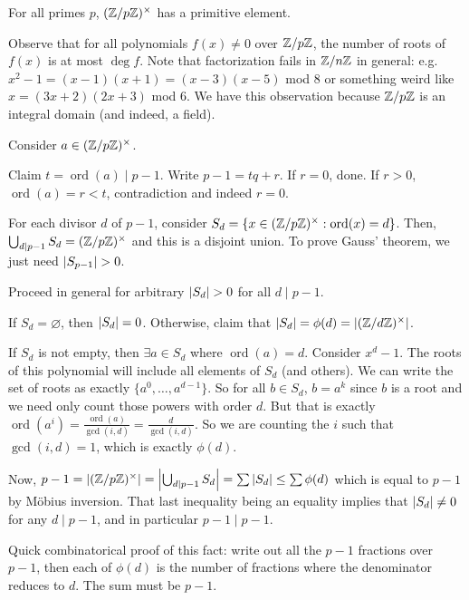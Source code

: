 \documentclass[notes]{agony}
\newcommand{\ord}{\operatorname{ord}}
\begin{document}
\begin{theorem}
  For all primes $p$, $(\mathbb{Z}/p\mathbb{Z})^\times$ has a primitive element.
\end{theorem}
\begin{prf}
  Observe that for all polynomials $f(x) \neq 0$ over $\mathbb{Z}/p\mathbb{Z}$,
  the number of roots of $f(x)$ is at most $\deg f$.
  Note that factorization fails in $\mathbb{Z}/n\mathbb{Z}$ in general:
  e.g. $x^2 - 1 = (x-1)(x+1) = (x-3)(x-5)$ mod 8
  or something weird like $x = (3x+2)(2x+3)$ mod 6.
  We have this observation because $\mathbb{Z}/p\mathbb{Z}$ is an integral domain (and indeed, a field).

  Consider $a \in (\mathbb{Z}/p\mathbb{Z})^\times$.

  Claim $t=\ord(a) \mid p-1$.
  Write $p-1=tq+r$. If $r=0$, done.
  If $r > 0$, $\ord(a) = r < t$, contradiction and indeed $r=0$.

  For each divisor $d$ of $p-1$, consider
  $S_d = \{x \in (\Z/p\Z)^\times : \ord(x) = d\}$.
  Then, $\bigcup_{d \mid p-1}S_d = (\mathbb{Z}/p\mathbb{Z})^\times$
  and this is a disjoint union.
  To prove Gauss' theorem, we just need $\abs{S_{p-1}} > 0$.

  Proceed in general for arbitrary $\abs{S_d} > 0$ for all $d \mid p-1$.

  If $S_d = \varnothing$, then $\abs{S_d} = 0$.
  Otherwise, claim that $\abs{S_d} = \phi(d) = \abs{(\mathbb{Z}/d\mathbb{Z})^\times}$.

  If $S_d$ is not empty, then $\exists a \in S_d$ where $\ord(a) = d$.
  Consider $x^d - 1$.
  The roots of this polynomial will include all elements of $S_d$ (and others).
  We can write the set of roots as exactly $\{a^0,\dotsc,a^{d-1}\}$.
  So for all $b \in S_d$, $b = a^k$ since $b$ is a root
  and we need only count those powers with order $d$.
  But that is exactly $\ord(a^i) = \frac{\ord(a)}{\gcd(i,d)} = \frac{d}{\gcd(i,d)}$.
  So we are counting the $i$ such that $\gcd(i,d) = 1$,
  which is exactly $\phi(d)$.

  Now, $p-1 = \abs{(\mathbb{Z}/p\mathbb{Z})^\times} = \abs{\bigcup_{d \mid p-1}S_d} = \sum\abs{S_d} \leq \sum \phi(d)$ which is equal to $p-1$ by M\"obius inversion.
  That last inequality being an equality implies that
  $\abs{S_d} \neq 0$ for any $d \mid p-1$, and in particular $p-1 \mid p-1$.

  Quick combinatorical proof of this fact:
  write out all the $p-1$ fractions over $p-1$,
  then each of $\phi(d)$ is the number of fractions
  where the denominator reduces to $d$. The sum must be $p-1$.
\end{prf}
\end{document}
